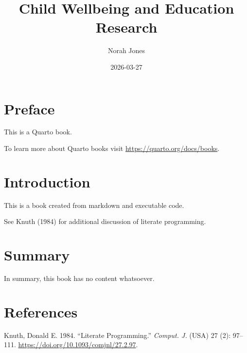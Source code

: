 \documentclass[
  letterpaper,
  DIV=11,
  numbers=noendperiod]{scrreprt}
\title{Child Wellbeing and Education Research}
\author{Norah Jones}
\date{2026-03-27}
\newlength{\cslhangindent}
\newenvironment{CSLReferences}[2] %
 {\begin{list}{}{%
  \setlength{\itemindent}{0pt}
  \setlength{\leftmargin}{0pt}
  \setlength{\parsep}{0pt}
  \ifodd #1
   \setlength{\leftmargin}{\cslhangindent}
   \setlength{\itemindent}{-1\cslhangindent}
  \fi
  \setlength{\itemsep}{#2\baselineskip}}}
 {\end{list}}
\renewcommand*\contentsname{Table of contents}
\newcommand\contentsname{Table of contents}
\begin{document}
\maketitle

\renewcommand*\contentsname{Table of contents}
{
\setcounter{tocdepth}{2}
\tableofcontents
}


\chapter*{Preface}\label{preface}


This is a Quarto book.

To learn more about Quarto books visit
\url{https://quarto.org/docs/books}.


\chapter{Introduction}\label{introduction}

This is a book created from markdown and executable code.

See Knuth (1984) for additional discussion of literate programming.


\chapter{Summary}\label{summary}

In summary, this book has no content whatsoever.


\chapter*{References}\label{references}


\protect{}\label{refs}
\begin{CSLReferences}{1}{1}
Knuth, Donald E. 1984. {``Literate Programming.''} \emph{Comput. J.}
(USA) 27 (2): 97--111. \url{https://doi.org/10.1093/comjnl/27.2.97}.

\end{CSLReferences}
\end{document}
